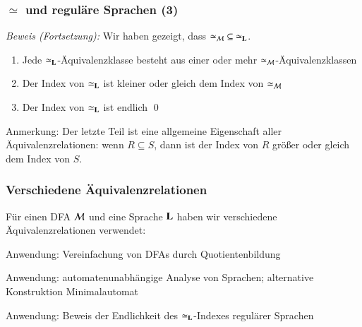 \documentclass[aspectratio=1610,onlymath]{beamer}
\begin{document}
\begin{frame}[t]\frametitle{$\simeq$ und reguläre Sprachen (3)}


\emph{Beweis (Fortsetzung):} Wir haben gezeigt, dass ${\simeq_{\mathcal{M}}}\subseteq {\simeq_{\textbf{\textcolor{black}{L}}}}$.\pause
\medskip

\begin{enumerate}[$\leadsto$]
\item Jede ${\simeq_{\textbf{\textcolor{black}{L}}}}$-Äquivalenzklasse besteht aus einer oder mehr ${\simeq_{\mathcal{M}}}$-Äquivalenzklassen\pause
\item Der Index von ${\simeq_{\textbf{\textcolor{black}{L}}}}$ ist kleiner oder gleich dem Index von ${\simeq_{\mathcal{M}}}$\pause
\item Der Index von ${\simeq_{\textbf{\textcolor{black}{L}}}}$ ist endlich \qed
\end{enumerate}
\medskip

\textcolor{devilscss}{\footnotesize Anmerkung: Der letzte Teil ist eine allgemeine Eigenschaft aller Äquivalenzrelationen: wenn $R\subseteq S$, dann ist der Index von $R$ größer oder gleich dem Index von $S$.}

\end{frame}

\begin{frame}[t]\frametitle{Verschiedene Äquivalenzrelationen}

Für einen DFA $\mathcal{M}$ und eine Sprache $\textbf{\textcolor{black}{L}}$ haben wir verschiedene
Äquivalenzrelationen verwendet:
\medskip

%
\medskip

\alert{Anwendung:} Vereinfachung von DFAs durch Quotientenbildung
\medskip

%
\medskip

\alert{Anwendung:} automatenunabhängige Analyse von Sprachen; alternative Konstruktion Minimalautomat
\medskip

%
\medskip

\alert{Anwendung:} Beweis der Endlichkeit des $\simeq_{\textbf{\textcolor{black}{L}}}$-Indexes regulärer Sprachen


\end{frame}
\end{document}
